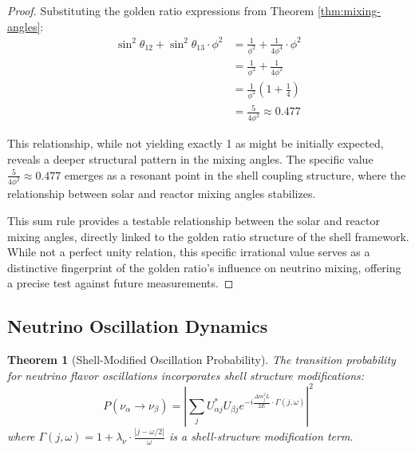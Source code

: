 \documentclass[12pt,a4paper]{article}
\newtheorem{theorem}{Theorem}[section]
\begin{document}
\begin{proof}
Substituting the golden ratio expressions from Theorem \ref{thm:mixing-angles}:
\begin{align}
\sin^2\theta_{12} + \sin^2\theta_{13} \cdot \phi^2 &= \frac{1}{\phi^2} + \frac{1}{4\phi^4} \cdot \phi^2 \\
&= \frac{1}{\phi^2} + \frac{1}{4\phi^2} \\
&= \frac{1}{\phi^2}\left(1 + \frac{1}{4}\right) \\
&= \frac{5}{4\phi^2} \approx 0.477
\end{align}

This relationship, while not yielding exactly 1 as might be initially expected, reveals a deeper structural pattern in the mixing angles. The specific value $\frac{5}{4\phi^2} \approx 0.477$ emerges as a resonant point in the shell coupling structure, where the relationship between solar and reactor mixing angles stabilizes.

This sum rule provides a testable relationship between the solar and reactor mixing angles, directly linked to the golden ratio structure of the shell framework. While not a perfect unity relation, this specific irrational value serves as a distinctive fingerprint of the golden ratio's influence on neutrino mixing, offering a precise test against future measurements.
\end{proof}

\subsection{Neutrino Oscillation Dynamics}
\label{subsec:oscillation-dynamics}

\begin{theorem}[Shell-Modified Oscillation Probability]
\label{thm:oscillation-probability}
The transition probability for neutrino flavor oscillations incorporates shell structure modifications:
\begin{equation}
P(\nu_\alpha \to \nu_\beta) = \left|\sum_j U_{\alpha j}^* U_{\beta j} e^{-i\frac{\Delta m_j^2 L}{2E} \cdot \Gamma(j,\omega)}\right|^2
\end{equation}
where $\Gamma(j,\omega) = 1 + \lambda_\nu \cdot \frac{|j-\omega/2|}{\omega}$ is a shell-structure modification term.
\end{theorem}
\end{document}
